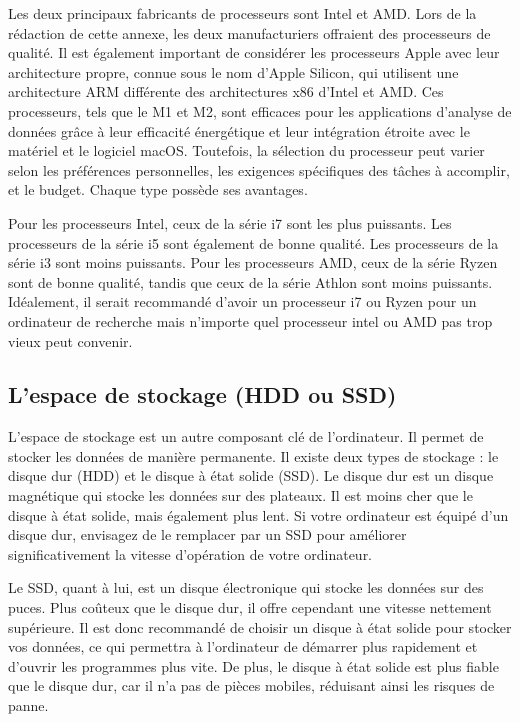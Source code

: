 \documentclass[
  letterpaper,
  DIV=11,
  numbers=noendperiod]{scrreprt}
\begin{document}
Les deux principaux fabricants de processeurs sont Intel et AMD. Lors de
la rédaction de cette annexe, les deux manufacturiers offraient des
processeurs de qualité. Il est également important de considérer les
processeurs Apple avec leur architecture propre, connue sous le nom
d'Apple Silicon, qui utilisent une architecture ARM différente des
architectures x86 d'Intel et AMD. Ces processeurs, tels que le M1 et M2,
sont efficaces pour les applications d'analyse de données grâce à leur
efficacité énergétique et leur intégration étroite avec le matériel et
le logiciel macOS. Toutefois, la sélection du processeur peut varier
selon les préférences personnelles, les exigences spécifiques des tâches
à accomplir, et le budget. Chaque type possède ses avantages.

Pour les processeurs Intel, ceux de la série i7 sont les plus puissants.
Les processeurs de la série i5 sont également de bonne qualité. Les
processeurs de la série i3 sont moins puissants. Pour les processeurs
AMD, ceux de la série Ryzen sont de bonne qualité, tandis que ceux de la
série Athlon sont moins puissants. Idéalement, il serait recommandé
d'avoir un processeur i7 ou Ryzen pour un ordinateur de recherche mais
n'importe quel processeur intel ou AMD pas trop vieux peut convenir.

\hypertarget{lespace-de-stockage-hdd-ou-ssd}{%
\subsection{L'espace de stockage (HDD ou
SSD)}\label{lespace-de-stockage-hdd-ou-ssd}}

L'espace de stockage est un autre composant clé de l'ordinateur. Il
permet de stocker les données de manière permanente. Il existe deux
types de stockage : le disque dur (HDD) et le disque à état solide
(SSD). Le disque dur est un disque magnétique qui stocke les données sur
des plateaux. Il est moins cher que le disque à état solide, mais
également plus lent. Si votre ordinateur est équipé d'un disque dur,
envisagez de le remplacer par un SSD pour améliorer significativement la
vitesse d'opération de votre ordinateur.

Le SSD, quant à lui, est un disque électronique qui stocke les données
sur des puces. Plus coûteux que le disque dur, il offre cependant une
vitesse nettement supérieure. Il est donc recommandé de choisir un
disque à état solide pour stocker vos données, ce qui permettra à
l'ordinateur de démarrer plus rapidement et d'ouvrir les programmes plus
vite. De plus, le disque à état solide est plus fiable que le disque
dur, car il n'a pas de pièces mobiles, réduisant ainsi les risques de
panne.
\end{document}
